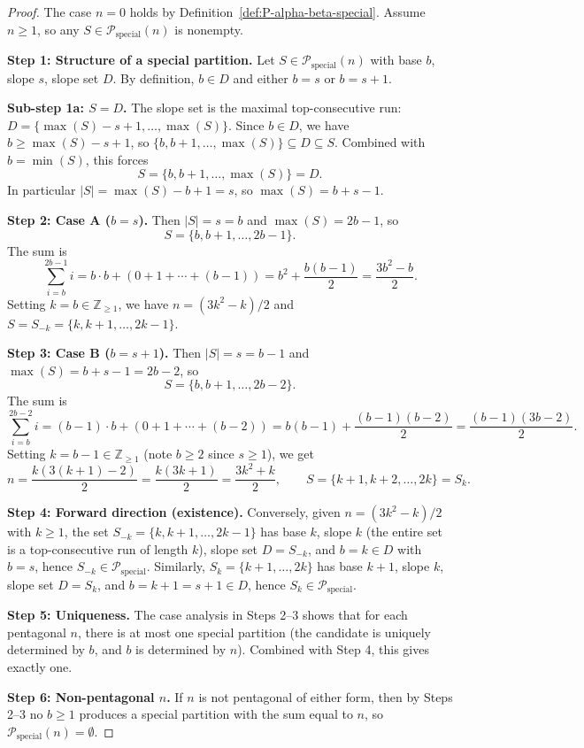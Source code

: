 \begin{proof}\leanok
The case $n = 0$ holds by Definition~\ref{def:P-alpha-beta-special}. Assume $n \geq 1$, so any $S \in \mathcal{P}_{\mathrm{special}}(n)$ is nonempty.

\textbf{Step 1: Structure of a special partition.}
Let $S \in \mathcal{P}_{\mathrm{special}}(n)$ with base $b$, slope $s$, slope set $D$. By definition, $b \in D$ and either $b = s$ or $b = s + 1$.

\textbf{Sub-step 1a: $S = D$.}
The slope set is the maximal top-consecutive run: $D = \{\max(S) - s + 1, \ldots, \max(S)\}$. Since $b \in D$, we have $b \geq \max(S) - s + 1$, so $\{b, b+1, \ldots, \max(S)\} \subseteq D \subseteq S$. Combined with $b = \min(S)$, this forces
$$S = \{b, b+1, \ldots, \max(S)\} = D.$$
In particular $|S| = \max(S) - b + 1 = s$, so $\max(S) = b + s - 1$.

\textbf{Step 2: Case A ($b = s$).}
Then $|S| = s = b$ and $\max(S) = 2b - 1$, so
$$S = \{b, b+1, \ldots, 2b - 1\}.$$
The sum is
$$\sum_{i=b}^{2b-1} i = b \cdot b + (0 + 1 + \cdots + (b-1)) = b^2 + \frac{b(b-1)}{2} = \frac{3b^2 - b}{2}.$$
Setting $k = b \in \mathbb{Z}_{\geq 1}$, we have $n = (3k^2 - k)/2$ and $S = S_{-k} = \{k, k+1, \ldots, 2k - 1\}$.

\textbf{Step 3: Case B ($b = s + 1$).}
Then $|S| = s = b - 1$ and $\max(S) = b + s - 1 = 2b - 2$, so
$$S = \{b, b+1, \ldots, 2b - 2\}.$$
The sum is
$$\sum_{i=b}^{2b-2} i = (b-1) \cdot b + (0 + 1 + \cdots + (b-2)) = b(b-1) + \frac{(b-1)(b-2)}{2} = \frac{(b-1)(3b - 2)}{2}.$$
Setting $k = b - 1 \in \mathbb{Z}_{\geq 1}$ (note $b \geq 2$ since $s \geq 1$), we get
$$n = \frac{k(3(k+1) - 2)}{2} = \frac{k(3k + 1)}{2} = \frac{3k^2 + k}{2}, \qquad S = \{k+1, k+2, \ldots, 2k\} = S_k.$$

\textbf{Step 4: Forward direction (existence).}
Conversely, given $n = (3k^2 - k)/2$ with $k \geq 1$, the set $S_{-k} = \{k, k+1, \ldots, 2k - 1\}$ has base $k$, slope $k$ (the entire set is a top-consecutive run of length $k$), slope set $D = S_{-k}$, and $b = k \in D$ with $b = s$, hence $S_{-k} \in \mathcal{P}_{\mathrm{special}}$. Similarly, $S_k = \{k+1, \ldots, 2k\}$ has base $k+1$, slope $k$, slope set $D = S_k$, and $b = k+1 = s+1 \in D$, hence $S_k \in \mathcal{P}_{\mathrm{special}}$.

\textbf{Step 5: Uniqueness.}
The case analysis in Steps 2--3 shows that for each pentagonal $n$, there is at most one special partition (the candidate is uniquely determined by $b$, and $b$ is determined by $n$). Combined with Step 4, this gives exactly one.

\textbf{Step 6: Non-pentagonal $n$.}
If $n$ is not pentagonal of either form, then by Steps 2--3 no $b \geq 1$ produces a special partition with the sum equal to $n$, so $\mathcal{P}_{\mathrm{special}}(n) = \emptyset$.
\end{proof}

